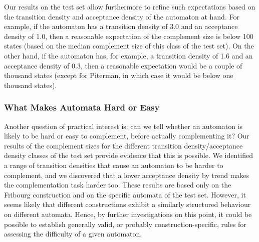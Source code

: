 Our results on the \goal{} test set allow furthermore to refine such expectations based on the transition density and acceptance density of the automaton at hand. For example, if the automaton has a transition density of 3.0 and an acceptance density of 1.0, then a reasonable expectation of the complement size is below 100 states (based on the median complement size of this class of the \goal{} test set). On the other hand, if the automaton has, for example, a transition density of 1.6 and an acceptance density of 0.3, then a reasonable expectation would be a couple of thousand states (except for Piterman, in which case it would be below one thousand states).


\subsubsection{What Makes Automata Hard or Easy}
Another question of practical interest is: can we tell whether an automaton is likely to be hard or easy to complement, before actually complementing it? Our results of the complement sizes for the different transition density/acceptance density classes of the \goal{} test set provide evidence that this is possible. We identified a range of transition densities that cause an automaton to be harder to complement, and we discovered that a lower acceptance density by trend makes the complementation task harder too. These results are based only on the Fribourg construction and on the specific automata of the \goal{} test set. However, it seems likely that different constructions exhibit a similarly structured behaviour on different automata. Hence, by further investigations on this point, it could be possible to establish generally valid, or probably construction-specific, rules for assessing the difficulty of a given automaton.

